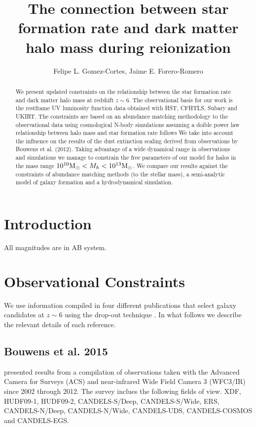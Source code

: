 \documentclass{emulateapj}
\newcommand{\Msun}{{\ifmmode{{\rm {M_{\odot}}}}\else{${\rm{M_{\odot}}}$}\fi}}
\begin{document}
\title{The connection between star formation rate and dark matter halo
  mass during reionization}


\author{Felipe L. Gomez-Cortes, Jaime E. Forero-Romero}  

\begin{abstract}
We present updated constraints on the relationship between the star
formation rate and dark matter halo mass at redshift $z\sim 6$.
The observational basis for our work is the restframe UV luminosity
function data obtained with HST, CFHTLS, Subary and UKIRT.
The constraints are based on an abundance matching methodology to the
observational data using cosmological N-body simulations assuming a
doible power law relationship between halo mass and star formation
rate follows
We take into account the influence on the results of the dust extinction
scaling derived from observations by Bouwens et al. (2012).
Taking advantage of a wide dynamical range in observations and
simulations we manage to constrain the free parameters of our model
for halos in the mass range $10^{10}\Msun < M_{h}<10^{13}\Msun$. 
We compare our results against the constraints of abundance matching
methods (to the stellar mass), a semi-analytic model of galaxy
formation and a hydrodynamical simulation.
\end{abstract}


\section{Introduction}
\label{sec:intro}


All magnitudes are in AB system.
\section{Observational Constraints}
\label{sec:theo}

We use information compiled in four different publications that select
galaxy candidates at $z\sim 6$ using the drop-out  technique
\citep{Steidel96}.   
In what follows we describe the relevant details of each reference.


\subsection{Bouwens et al. 2015}
\citet{Bouwens15} presented results from a compilation of
observations taken with the Advanced Camera for Surveys (ACS) and
near-infrared Wide Field Camera 3 (WFC3/IR) since 2002 through 2012. 
The survey inclues the following fields of view. XDF,
HUDF09-1, HUDF09-2, CANDELS-S/Deep,  CANDELS-S/Wide, ERS,
CANDELS-N/Deep, CANDELS-N/Wide, CANDELS-UDS,  CANDELS-COSMOS and
CANDELS-EGS.
\end{document}

